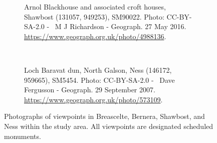 \begin{figure}
\begin{subfigure}[t]{.48\textwidth}
    \caption*{Arnol Blackhouse and associated croft houses, Shawbost (131057, 949253), SM90022. Photo: CC-BY-SA-2.0 - \textcopyright~M J Richardson - Geograph. 27 May 2016. \url{https://www.geograph.org.uk/photo/4988136}.}
  \end{subfigure}
  ~
  \begin{subfigure}[t]{.48\textwidth}
    \caption*{Loch Baravat dun, North Galson, Ness (146172, 959665), SM5454. Photo: CC-BY-SA-2.0 - \textcopyright~Dave Fergusson - Geograph. 29 September 2007. \url{https://www.geograph.org.uk/photo/573109}.}
  \end{subfigure}
  \caption{Photographs of viewpoints in Breascelte, Bernera, Shawbost, and Ness within the study area. All viewpoints are designated scheduled monuments. \label{fig:viewpoints1}}
\end{figure}

